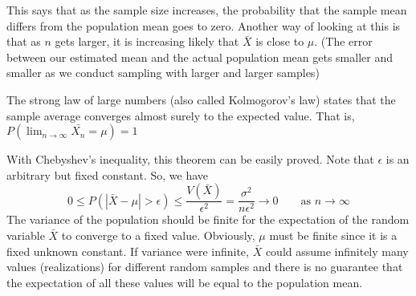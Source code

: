 This says that as the sample size increases, the probability that the sample mean differs from the population mean goes to zero. Another way of looking at this is that as $n$ gets larger, it is increasing likely that $\bar{X}$ is close to $\mu$. (The error between our estimated mean and the actual population mean gets smaller and smaller as we conduct sampling with larger and larger samples)
\begin{note}
\end{note}
The strong law of large numbers (also called Kolmogorov's law) states that the sample average converges almost surely to the expected value.
That is, $P(\lim_{n \xrightarrow{} \infty}\bar{X_n} = \mu ) = 1$
\begin{note}
\end{note}
With Chebyshev's inequality, this theorem can be easily proved. Note that $\epsilon$ is an arbitrary but fixed constant. So, we have
$$
0 \leq P(|\bar{X} - \mu| > \epsilon) \leq \dfrac{V(\bar{X})}{\epsilon^2} = \dfrac{\sigma^2}{n \epsilon^2} \xrightarrow{} 0 \qquad \text{as } n \xrightarrow{} \infty
$$
The variance of the population should be finite for the expectation of the random variable $\bar{X}$ to converge to a fixed value. Obviously, $\mu$ must be finite since it is a fixed unknown constant. If variance were infinite,  $\bar{X}$ could assume infinitely many values (realizations) for different random samples and there is no guarantee that the expectation of all these values will be equal to the population mean.

